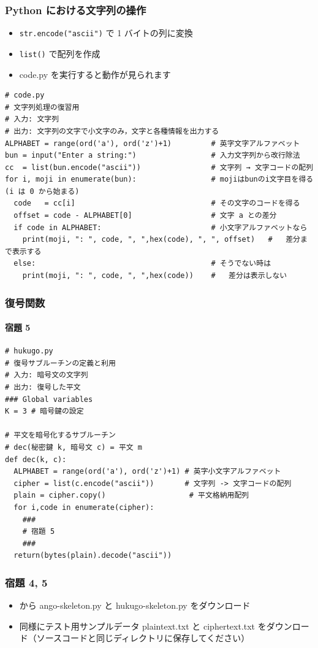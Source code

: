 \begin{frame}
\frametitle{Python における文字列の操作}
  \begin{itemize}
\item {\tt str.encode("ascii")} で 1 バイトの列に変換
\item {\tt list()} で配列を作成
\item code.py を実行すると動作が見られます
  \end{itemize}
  \begin{lstlisting}[caption={code.py},label=lst:code]
# code.py
# 文字列処理の復習用
# 入力: 文字列
# 出力: 文字列の文字で小文字のみ，文字と各種情報を出力する
ALPHABET = range(ord('a'), ord('z')+1)         # 英字文字アルファベット
bun = input("Enter a string:")                 # 入力文字列から改行除法
cc  = list(bun.encode("ascii"))                # 文字列 → 文字コードの配列
for i, moji in enumerate(bun):                 # mojiはbunのi文字目を得る (i は 0 から始まる)
  code   = cc[i]                               # その文字のコードを得る
  offset = code - ALPHABET[0]                  # 文字 a との差分
  if code in ALPHABET:                         # 小文字アルファベットなら
    print(moji, ": ", code, ", ",hex(code), ", ", offset)   #   差分まで表示する
  else:                                        # そうでない時は
    print(moji, ": ", code, ", ",hex(code))    #   差分は表示しない
  \end{lstlisting}
\end{frame}
\begin{frame}
\frametitle{復号関数}
\framesubtitle{宿題 5}
  \begin{lstlisting}[caption={hukugo.py},label=lst:hukugo]
# hukugo.py
# 復号サブルーチンの定義と利用
# 入力: 暗号文の文字列
# 出力: 復号した平文
### Global variables
K = 3 # 暗号鍵の設定

# 平文を暗号化するサブルーチン
# dec(秘密鍵 k, 暗号文 c) = 平文 m
def dec(k, c):
  ALPHABET = range(ord('a'), ord('z')+1) # 英字小文字アルファベット
  cipher = list(c.encode("ascii"))       # 文字列 -> 文字コードの配列
  plain = cipher.copy()                   # 平文格納用配列
  for i,code in enumerate(cipher):
    ###
    # 宿題 5
    ###
  return(bytes(plain).decode("ascii"))
  \end{lstlisting}
\end{frame}
\begin{frame}
\frametitle{宿題 4, 5}
  \begin{itemize}
\item \href{https://sites.google.com/presystems.xyz/elementarycs/top}{}から ango-skeleton.py と hukugo-skeleton.py をダウンロード
\item 同様にテスト用サンプルデータ plaintext.txt と ciphertext.txt をダウンロード（ソースコードと同じディレクトリに保存してください）
  \end{itemize}
\end{frame}
